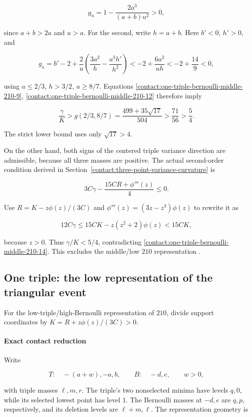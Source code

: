 \[
 g_u=1-\frac{2a^3}{(a+b)u^2}>0,
\]

since $a+b>2a$ and $u>a$. For the second, write $h=a+b$.
Here $b'<0$, $h'>0$, and

\[
 g_a=b'-2+\frac2u\left(\frac{3a^2}{h}
                          -\frac{a^3h'}{h^2}\right)
 <-2+\frac{6a^2}{uh}
 <-2+\frac{14}{9}<0,
\]

using $a\le 2/3$, $h>3/2$, $u\ge 8/7$. Equations \eqref{contact:one-triple-bernoulli-middle-210-9}, \eqref{contact:one-triple-bernoulli-middle-210-12} therefore imply

\[
 \frac\gamma K>g(2/3,8/7)
   =\frac{499+35\sqrt{17}}{504}
   >\frac{71}{56}>\frac54.
\tag{B.11.14}\label{contact:one-triple-bernoulli-middle-210-14}
\]

The strict lower bound uses only $\sqrt{17}>4$.

On the other hand, both signs of the centered triple variance direction
are admissible, because all three masses are positive. The actual
second-order condition derived in
Section~\ref{contact:three-point-variance-curvature}
is

\[
 3C\gamma-\frac{15CR+\phi'''(z)}4\leq0.
\]

Use $R=K-z \phi(z)/(3C)$ and
$\phi'''(z)=(3z-z^3)\phi(z)$ to rewrite it as

\[
 12C\gamma\leq15CK-z(z^2+2)\phi(z)<15CK,
\]

because $z>0$. Thus $\gamma/K<5/4$, contradicting \eqref{contact:one-triple-bernoulli-middle-210-14}.
This excludes the middle/low $210$ representation .
\subsection{One triple: the low representation of the triangular event}\label{contact:low-210-algebraic-reduction}


For the low-triple/high-Bernoulli representation of $210$, divide support coordinates by
$K=R+z \phi(z)/(3C)>0$.

\paragraph{Exact contact reduction}

Write

\[
 T:\quad -(a+w),-a,b,\qquad B:\quad -d,e,
 \qquad w>0,
\]

with triple masses $\ell,m,r$. The triple's two nonselected minima have
levels $q,0$, while its selected lowest point has level $1$.
The Bernoulli masses at $-d,e$ are $q,p$, respectively, and its deletion
levels are $\ell+m,\ell$. The representation geometry is

